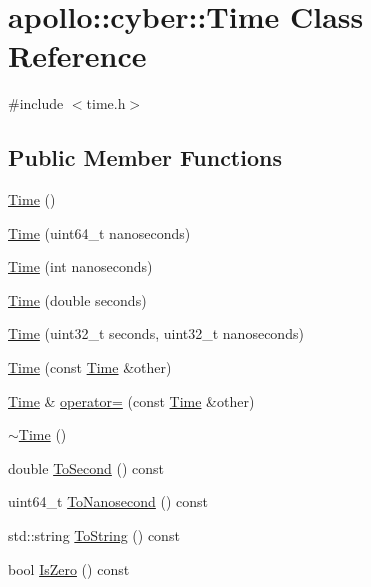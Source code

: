 \hypertarget{classapollo_1_1cyber_1_1Time}{\section{apollo\-:\-:cyber\-:\-:Time Class Reference}
\label{classapollo_1_1cyber_1_1Time}
}


{\ttfamily \#include $<$time.\-h$>$}

\subsection*{Public Member Functions}
\begin{DoxyCompactItemize}
\item 
\hyperlink{classapollo_1_1cyber_1_1Time_a3944bb5f3b0fc85f9f1b963fede8aecd}{Time} ()
\item 
\hyperlink{classapollo_1_1cyber_1_1Time_ad94127948f2fb6898765bb6e4b748eac}{Time} (uint64\-\_\-t nanoseconds)
\item 
\hyperlink{classapollo_1_1cyber_1_1Time_ae9faa3f7a10a23b714c53036b7eec841}{Time} (int nanoseconds)
\item 
\hyperlink{classapollo_1_1cyber_1_1Time_a6648d239664ed5ca716c9b480c3a9c90}{Time} (double seconds)
\item 
\hyperlink{classapollo_1_1cyber_1_1Time_a0c5d8489dfc4c1e0dde8ceeb8cb61341}{Time} (uint32\-\_\-t seconds, uint32\-\_\-t nanoseconds)
\item 
\hyperlink{classapollo_1_1cyber_1_1Time_a64f5cf1450ecef3e3013aae7b59c9fa4}{Time} (const \hyperlink{classapollo_1_1cyber_1_1Time}{Time} \&other)
\item 
\hyperlink{classapollo_1_1cyber_1_1Time}{Time} \& \hyperlink{classapollo_1_1cyber_1_1Time_a47aad211e113aace632fdd2e5b940390}{operator=} (const \hyperlink{classapollo_1_1cyber_1_1Time}{Time} \&other)
\item 
\hyperlink{classapollo_1_1cyber_1_1Time_aa56f59db4d1bd25f10230c4adc683c37}{$\sim$\-Time} ()
\item 
double \hyperlink{classapollo_1_1cyber_1_1Time_ac2d42598d234b028c8a614ddb57bb858}{To\-Second} () const 
\item 
uint64\-\_\-t \hyperlink{classapollo_1_1cyber_1_1Time_aff5a02985e841ca9d40b20197c4cb395}{To\-Nanosecond} () const 
\item 
std\-::string \hyperlink{classapollo_1_1cyber_1_1Time_a7fdea74fd8e1bb4958b12c5a48cc0289}{To\-String} () const 
\item 
bool \hyperlink{classapollo_1_1cyber_1_1Time_ab81282bddd79b7adb74edea590198201}{Is\-Zero} () const 

\end{DoxyCompactItemize}
